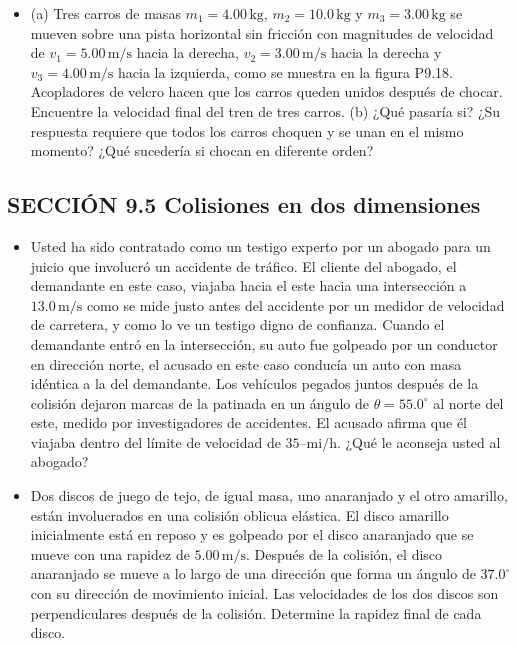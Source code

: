 \documentclass[11pt,a4paper]{article}
\begin{document}
\begin{itemize}
    \item[\textbf{18.}] (a) Tres carros de masas \(m_1 = 4.00\,\text{kg}\), \(m_2 = 10.0\,\text{kg}\) y \(m_3 = 3.00\,\text{kg}\) se mueven sobre una pista horizontal sin fricción con magnitudes de velocidad de \(v_1 = 5.00\,\text{m/s}\) hacia la derecha, \(v_2 = 3.00\,\text{m/s}\) hacia la derecha y \(v_3 = 4.00\,\text{m/s}\) hacia la izquierda, como se muestra en la figura P9.18. Acopladores de velcro hacen que los carros queden unidos después de chocar. Encuentre la velocidad final del tren de tres carros. (b) ¿Qué pasaría si? ¿Su respuesta requiere que todos los carros choquen y se unan en el mismo momento? ¿Qué sucedería si chocan en diferente orden?
    \vspace*{6cm}
\end{itemize}

\subsection*{SECCIÓN 9.5 Colisiones en dos dimensiones}

\begin{itemize}
    \item[\textbf{19.}] Usted ha sido contratado como un testigo experto por un abogado para un juicio que involucró un accidente de tráfico. El cliente del abogado, el demandante en este caso, viajaba hacia el este hacia una intersección a \(13.0\,\text{m/s}\) como se mide justo antes del accidente por un medidor de velocidad de carretera, y como lo ve un testigo digno de confianza. Cuando el demandante entró en la intersección, su auto fue golpeado por un conductor en dirección norte, el acusado en este caso conducía un auto con masa idéntica a la del demandante. Los vehículos pegados juntos después de la colisión dejaron marcas de la patinada en un ángulo de \(\theta = 55.0^\circ\) al norte del este, medido por investigadores de accidentes. El acusado afirma que él viajaba dentro del límite de velocidad de \(35\text{--mi/h}\). ¿Qué le aconseja usted al abogado?
    \vspace*{6cm}

    \item[\textbf{20.}] Dos discos de juego de tejo, de igual masa, uno anaranjado y el otro amarillo, están involucrados en una colisión oblicua elástica. El disco amarillo inicialmente está en reposo y es golpeado por el disco anaranjado que se mueve con una rapidez de \(5.00\,\text{m/s}\). Después de la colisión, el disco anaranjado se mueve a lo largo de una dirección que forma un ángulo de \(37.0^\circ\) con su dirección de movimiento inicial. Las velocidades de los dos discos son perpendiculares después de la colisión. Determine la rapidez final de cada disco.
    \vspace*{6cm}
\end{itemize}
\end{document}
